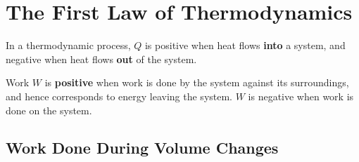 \documentclass{article}
\begin{document}
\newcommand{\hr}{\par\noindent\rule{\textwidth}{0.4pt}}

\newcommand{\bc}[1]{
	\begin{equation*}
		\begin{boxed}
			{#1}
		\end{boxed}
	\end{equation*}
}

\newcommand{\cond}[2]{
	\ifmmode
		{#1} \quad {#2}
	\else
		$$ {#1} \quad {#2} $$
	\fi
}

\newcommand{\matr}[1]{
	\ifmmode \bm{#1}
	\else \textit{\textbf{#1}}
	\fi
}
\newcommand{\vect}[1]{
	\ifmmode \mathbf{#1}
	\else \textbf{#1}
	\fi
}


\tableofcontents

\section{The First Law of Thermodynamics}

In a thermodynamic process, $ Q $ is positive when heat flows \textbf{into} a system, and negative when heat flows \textbf{out} of the system.

Work $ W $ is \textbf{positive} when work is done by the system against its surroundings, and hence corresponds to energy leaving the system. $ W $ is negative when work is done on the system.

\subsection{Work Done During Volume Changes}
\end{document}

